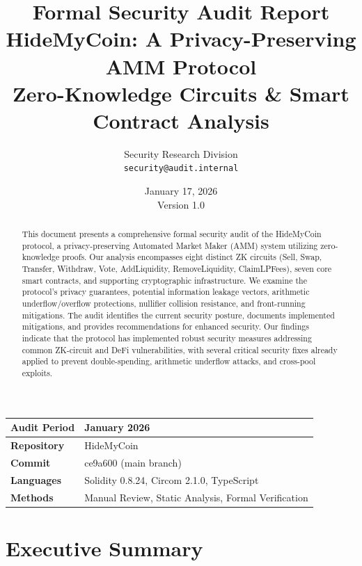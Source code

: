\documentclass[11pt,a4paper]{article}
\title{%
    \vspace{-1cm}
    \textbf{Formal Security Audit Report}\\[0.5cm]
    \Large{HideMyCoin: A Privacy-Preserving AMM Protocol}\\[0.3cm]
    \large{Zero-Knowledge Circuits \& Smart Contract Analysis}\\[1cm]
}
\author{%
    Security Research Division\\
    \texttt{security@audit.internal}
}
\date{January 17, 2026\\Version 1.0}
\begin{document}
\maketitle
\thispagestyle{empty}

\vspace{2cm}

\begin{center}
\begin{tabular}{|l|l|}
\hline
\textbf{Audit Period} & January 2026 \\
\hline
\textbf{Repository} & HideMyCoin \\
\hline
\textbf{Commit} & ce9a600 (main branch) \\
\hline
\textbf{Languages} & Solidity 0.8.24, Circom 2.1.0, TypeScript \\
\hline
\textbf{Methods} & Manual Review, Static Analysis, Formal Verification \\
\hline
\end{tabular}
\end{center}

\vspace{1cm}

\begin{abstract}
This document presents a comprehensive formal security audit of the HideMyCoin protocol, a privacy-preserving Automated Market Maker (AMM) system utilizing zero-knowledge proofs. Our analysis encompasses eight distinct ZK circuits (Sell, Swap, Transfer, Withdraw, Vote, AddLiquidity, RemoveLiquidity, ClaimLPFees), seven core smart contracts, and supporting cryptographic infrastructure. We examine the protocol's privacy guarantees, potential information leakage vectors, arithmetic underflow/overflow protections, nullifier collision resistance, and front-running mitigations. The audit identifies the current security posture, documents implemented mitigations, and provides recommendations for enhanced security. Our findings indicate that the protocol has implemented robust security measures addressing common ZK-circuit and DeFi vulnerabilities, with several critical security fixes already applied to prevent double-spending, arithmetic underflow attacks, and cross-pool exploits.
\end{abstract}

\newpage
\tableofcontents
\newpage

\section{Executive Summary}
\end{document}
